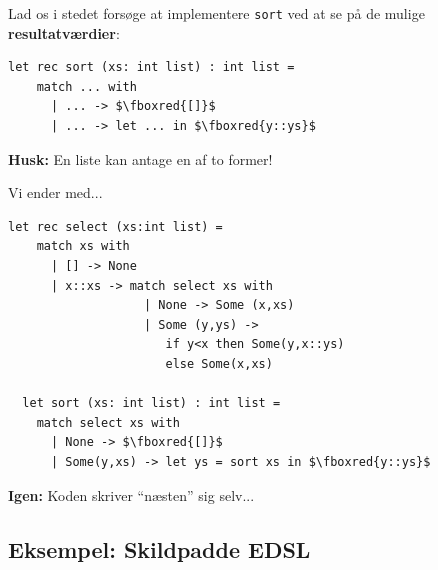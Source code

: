 \documentclass[rgb]{beamer}
\begin{document}
\begin{frame}[fragile]


Lad os i stedet forsøge at implementere \lstinline{sort} ved at se på de
mulige \textbf{resultatværdier}:

\vspace{3mm}

\begin{lstlisting}[numbers=none,frame=none,mathescape]
  let rec sort (xs: int list) : int list =
    match ... with
      | ... -> $\fboxred{[]}$
      | ... -> let ... in $\fboxred{y::ys}$
\end{lstlisting}

\vspace{3mm}

\textbf{Husk:} En liste kan antage en af to former!

\vspace{3mm}

Vi ender med...

\end{frame}

\begin{frame}[fragile]


\begin{lstlisting}[numbers=none,frame=none,mathescape]
  let rec select (xs:int list) =
    match xs with
      | [] -> None
      | x::xs -> match select xs with
                   | None -> Some (x,xs)
                   | Some (y,ys) ->
                      if y<x then Some(y,x::ys)
                      else Some(x,xs)

  let sort (xs: int list) : int list =
    match select xs with
      | None -> $\fboxred{[]}$
      | Some(y,xs) -> let ys = sort xs in $\fboxred{y::ys}$
\end{lstlisting}

\vspace{3mm}

\textbf{Igen:} Koden skriver ``næsten'' sig selv...
\end{frame}

\subsection{Eksempel: Skildpadde EDSL}
\end{document}
